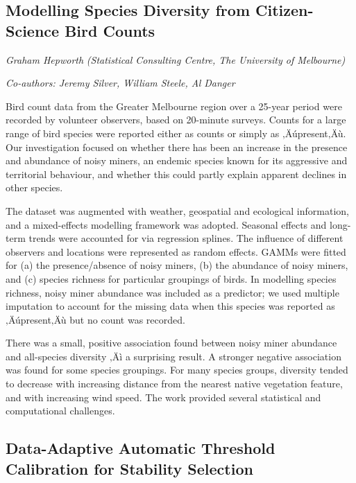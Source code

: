 \documentclass[
]{scrreprt}
\begin{document}
\subsection{Modelling Species Diversity from Citizen-Science Bird
Counts}\label{modelling-species-diversity-from-citizen-science-bird-counts}

\emph{Graham Hepworth} \emph{(Statistical
Consulting Centre, The University of Melbourne)}

\emph{Co-authors: Jeremy Silver, William Steele, Al Danger}

\setlength{\parskip}{0.5em}

Bird count data from the Greater Melbourne region over a 25-year period
were recorded by volunteer observers, based on 20-minute surveys. Counts
for a large range of bird species were reported either as counts or
simply as ‚Äúpresent‚Äù. Our investigation focused on whether there has
been an increase in the presence and abundance of noisy miners, an
endemic species known for its aggressive and territorial behaviour, and
whether this could partly explain apparent declines in other species.

The dataset was augmented with weather, geospatial and ecological
information, and a mixed-effects modelling framework was adopted.
Seasonal effects and long-term trends were accounted for via regression
splines. The influence of different observers and locations were
represented as random effects. GAMMs were fitted for (a) the
presence/absence of noisy miners, (b) the abundance of noisy miners, and
(c) species richness for particular groupings of birds. In modelling
species richness, noisy miner abundance was included as a predictor; we
used multiple imputation to account for the missing data when this
species was reported as ‚Äúpresent‚Äù but no count was recorded.

There was a small, positive association found between noisy miner
abundance and all-species diversity ‚Äì a surprising result. A stronger
negative association was found for some species groupings. For many
species groups, diversity tended to decrease with increasing distance
from the nearest native vegetation feature, and with increasing wind
speed. The work provided several statistical and computational
challenges.

\subsection{Data-Adaptive Automatic Threshold Calibration for Stability
Selection}\label{data-adaptive-automatic-threshold-calibration-for-stability-selection}
\end{document}
